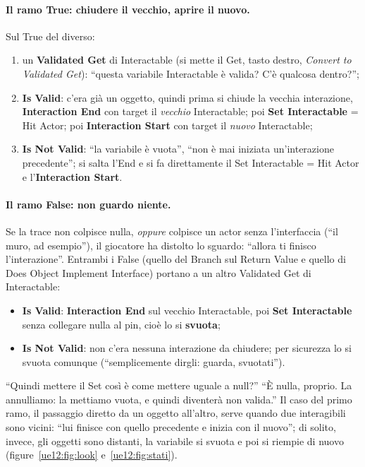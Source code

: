 \paragraph{Il ramo True: chiudere il vecchio, aprire il nuovo.} Sul True del diverso:
\begin{enumerate}
  \item un \textbf{Validated Get} di Interactable (si mette il Get, tasto destro,
        \emph{Convert to Validated Get}): ``questa variabile Interactable è valida? C'è
        qualcosa dentro?'';
  \item \textbf{Is Valid}: c'era già un oggetto, quindi prima si chiude la vecchia
        interazione, \textbf{Interaction End} con target il \emph{vecchio} Interactable;
        poi \textbf{Set Interactable} = Hit Actor; poi \textbf{Interaction Start} con
        target il \emph{nuovo} Interactable;
  \item \textbf{Is Not Valid}: ``la variabile è vuota'', ``non è mai iniziata
        un'interazione precedente''; si salta l'End e si fa direttamente il Set
        Interactable = Hit Actor e l'\textbf{Interaction Start}.
\end{enumerate}

\paragraph{Il ramo False: non guardo niente.} Se la trace non colpisce nulla, \emph{oppure}
colpisce un actor senza l'interfaccia (``il muro, ad esempio''), il giocatore ha distolto lo
sguardo: ``allora ti finisco l'interazione''. Entrambi i False (quello del Branch sul Return
Value e quello di Does Object Implement Interface) portano a un altro Validated Get di
Interactable:
\begin{itemize}
  \item \textbf{Is Valid}: \textbf{Interaction End} sul vecchio Interactable, poi
        \textbf{Set Interactable} senza collegare nulla al pin, cioè lo si
        \textbf{svuota};
  \item \textbf{Is Not Valid}: non c'era nessuna interazione da chiudere; per sicurezza
        lo si svuota comunque (``semplicemente dirgli: guarda, svuotati'').
\end{itemize}
``Quindi mettere il Set così è come mettere uguale a null?'' ``È nulla, proprio. La
annulliamo: la mettiamo vuota, e quindi diventerà non valida.'' Il caso del primo ramo,
il passaggio diretto da un oggetto all'altro, serve quando due interagibili sono vicini:
``lui finisce con quello precedente e inizia con il nuovo''; di solito, invece, gli oggetti
sono distanti, la variabile si svuota e poi si riempie di nuovo
(figure~\ref{ue12:fig:look} e~\ref{ue12:fig:stati}).

